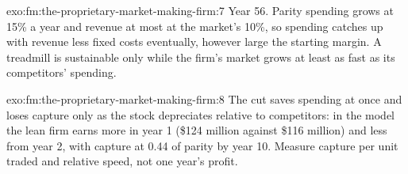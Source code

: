 \begin{solution}{exo:fm:the-proprietary-market-making-firm:7}
Year 56. Parity spending grows at 15\% a year and revenue at most at the market's 10\%, so spending catches up with revenue less fixed costs
eventually, however large the starting margin. A treadmill is sustainable only while the firm's market grows at least as fast as its competitors' spending.
\end{solution}

\begin{solution}{exo:fm:the-proprietary-market-making-firm:8}
The cut saves spending at once and loses capture only as the stock depreciates relative to competitors: in the model the lean firm earns more in
year 1 (\$124 million against \$116 million) and less from year 2, with capture at 0.44 of parity by year 10. Measure capture per unit traded and
relative speed, not one year's profit.
\end{solution}


